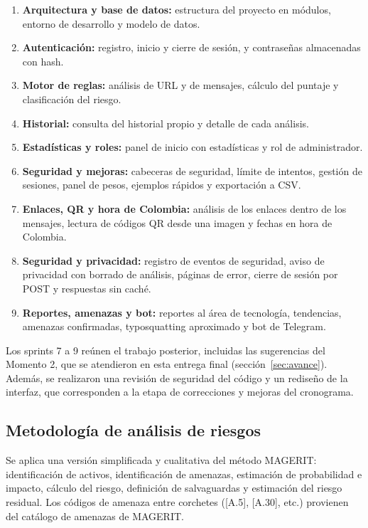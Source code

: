 \documentclass[journal,onecolumn,12pt,draftclsnofoot]{IEEEtran}
\begin{document}
\begin{enumerate}
  \item \textbf{Arquitectura y base de datos:} estructura del proyecto en módulos, entorno de desarrollo y modelo de datos.
  \item \textbf{Autenticación:} registro, inicio y cierre de sesión, y contraseñas almacenadas con hash.
  \item \textbf{Motor de reglas:} análisis de URL y de mensajes, cálculo del puntaje y clasificación del riesgo.
  \item \textbf{Historial:} consulta del historial propio y detalle de cada análisis.
  \item \textbf{Estadísticas y roles:} panel de inicio con estadísticas y rol de administrador.
  \item \textbf{Seguridad y mejoras:} cabeceras de seguridad, límite de intentos, gestión de sesiones, panel de pesos, ejemplos rápidos y exportación a CSV.
  \item \textbf{Enlaces, QR y hora de Colombia:} análisis de los enlaces dentro de los mensajes, lectura de códigos QR desde una imagen y fechas en hora de Colombia.
  \item \textbf{Seguridad y privacidad:} registro de eventos de seguridad, aviso de privacidad con borrado de análisis, páginas de error, cierre de sesión por POST y respuestas sin caché.
  \item \textbf{Reportes, amenazas y bot:} reportes al área de tecnología, tendencias, amenazas confirmadas, typosquatting aproximado y bot de Telegram.
\end{enumerate}

Los sprints 7 a 9 reúnen el trabajo posterior, incluidas las sugerencias del Momento 2, que se atendieron en esta entrega final (sección~\ref{sec:avance}). Además, se realizaron una revisión de seguridad del código y un rediseño de la interfaz, que corresponden a la etapa de correcciones y mejoras del cronograma.

\subsection{Metodología de análisis de riesgos}\label{sec:metriesgos}

Se aplica una versión simplificada y cualitativa del método MAGERIT: identificación de activos, identificación de amenazas, estimación de probabilidad e impacto, cálculo del riesgo, definición de salvaguardas y estimación del riesgo residual. Los códigos de amenaza entre corchetes ([A.5], [A.30], etc.) provienen del catálogo de amenazas de MAGERIT.
\end{document}
